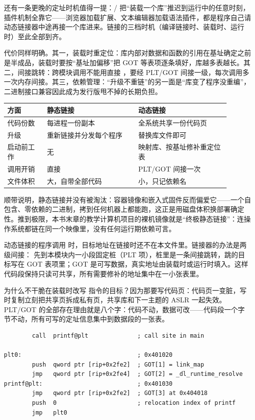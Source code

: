 还有一条更晚的定址时机值得一提：/ 把“装载一个库”推迟到运行中的任意时刻，插件机制全靠它——浏览器加载扩展、文本编辑器加载语法插件，都是程序自己请动态链接器中途再接一个库进来。链接的三档时机（编译链接时、装载时、运行时）至此全部到齐。

代价同样明确。其一，装载时重定位：库内部对数据和函数的引用在基址确定之前是半成品，装载时要按“基址加偏移”把 GOT 等表项逐条填好，库越多表越长。其二，间接跳转：跨模块调用不能用直接 ，要经 PLT/GOT 间接一级，每次调用多一次内存间接。其三，依赖管理：“升级不重链”的另一面是“库变了程序没重编”，二进制接口兼容因此成为发行版甩不掉的长期负担。

\begin{longtable}{L{0.16\linewidth}L{0.37\linewidth}L{0.37\linewidth}}
\toprule
方面 & 静态链接 & 动态链接 \\
\midrule
代码份数 & 每进程一份副本 & 全系统共享一份代码页 \\\tablerowrule
升级 & 重新链接并分发每个程序 & 替换库文件即可 \\\tablerowrule
启动前工作 & 无 & 映射库、按基址修补重定位表 \\\tablerowrule
调用开销 & 直接  & PLT/GOT 间接一次 \\\tablerowrule
文件体积 & 大，自带全部代码 & 小，只记依赖名 \\
\bottomrule
\end{longtable}

顺带说明，静态链接并没有被淘汰：容器镜像和嵌入式固件反而偏爱它——一个自包含、零依赖的二进制，拷到任何机器上都能跑，这正是用磁盘体积换部署确定性。推到极限，本书末章的教学计算机项目的裸机镜像就是“终极静态链接”：连操作系统都链在同一个映像里，没有任何运行期依赖可言。

动态链接的程序调用  时，目标地址在链接时还不在本文件里。链接器的办法是两级间接： 先到本模块内一小段固定桩（PLT 项），桩里是一条间接跳转，跳的目标写在 GOT 表项里；GOT 是可写数据，真实地址由装载时或运行时填入。这样代码段保持只读可共享，所有需要修补的地址集中在一小张表里。

为什么不干脆在装载时改写  指令的目标？因为那要写代码页：代码页一变脏，写时复制立刻把共享页拆成私有页，共享库和下一主题的 ASLR 一起失效。PLT/GOT 的全部存在理由就是八个字：代码不动，数据可改——代码段一个字节不动，所有可写的定址信息集中到数据段的一张表。

\begin{lstlisting}
        call  printf@plt              ; call site in main

plt0:                                 ; 0x401020
        push  qword ptr [rip+0x2fe2]  ; GOT[1] = link_map
        jmp   qword ptr [rip+0x2fe4]  ; GOT[2] = _dl_runtime_resolve
printf@plt:                           ; 0x401030
        jmp   qword ptr [rip+0x2fe2]  ; GOT[3] at 0x404018
        push  0                       ; relocation index of printf
        jmp   plt0
\end{lstlisting}

